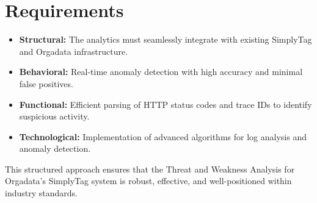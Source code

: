 \section{Requirements}

\begin{itemize}
	\item \textbf{Structural:} The analytics must seamlessly integrate with existing SimplyTag and Orgadata infrastructure.
	\item \textbf{Behavioral:} Real-time anomaly detection with high accuracy and minimal false positives.
	\item \textbf{Functional:} Efficient parsing of HTTP status codes and trace IDs to identify suspicious activity.
	\item \textbf{Technological:} Implementation of advanced algorithms for log analysis and anomaly detection.
\end{itemize}

This structured approach ensures that the Threat and Weakness Analysis for Orgadata’s SimplyTag system is robust, effective, and well-positioned within industry standards.

